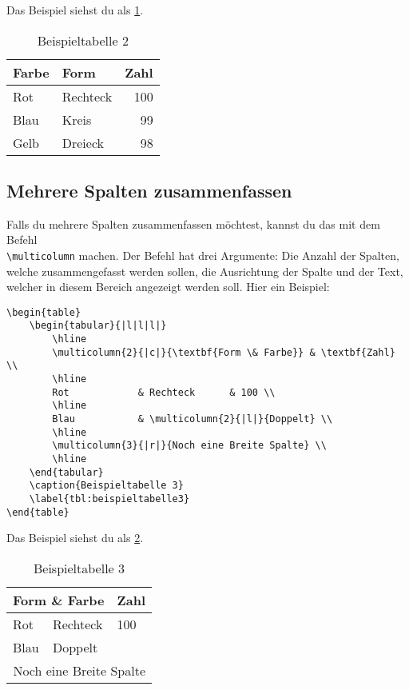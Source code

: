 Das Beispiel siehst du als \cref{tbl:beispieltabelle2}.

\begin{table}
	\centering
	\begin{tabular}{|l|l|r|}
		\textbf{Farbe} & \textbf{Form} & \textbf{Zahl} \\
		\hline
		Rot            & Rechteck      & 100 \\
		\hline
		Blau           & Kreis         & 99 \\
		\hline
		Gelb           & Dreieck       & 98 \\
		\hline
	\end{tabular}
	\caption{Beispieltabelle 2}
	\label{tbl:beispieltabelle2}
\end{table}

\subsection{Mehrere Spalten zusammenfassen}

Falls du mehrere Spalten zusammenfassen möchtest, kannst du das mit dem Befehl
\\
 \texttt{\textbackslash multicolumn} machen. Der Befehl hat drei Argumente: Die Anzahl der Spalten, welche zusammengefasst werden sollen, die Ausrichtung der Spalte und der Text, welcher in diesem Bereich angezeigt werden soll. Hier ein Beispiel:
\begin{lstlisting}
\begin{table}
	\begin{tabular}{|l|l|l|}
		\hline
		\multicolumn{2}{|c|}{\textbf{Form \& Farbe}} & \textbf{Zahl} \\
		\hline
		Rot            & Rechteck      & 100 \\
		\hline
		Blau           & \multicolumn{2}{|l|}{Doppelt} \\
		\hline
		\multicolumn{3}{|r|}{Noch eine Breite Spalte} \\
		\hline
	\end{tabular}
	\caption{Beispieltabelle 3}
	\label{tbl:beispieltabelle3}
\end{table}
\end{lstlisting}

Das Beispiel siehst du als \cref{tbl:beispieltabelle3}.

\begin{table}
	\centering
	\begin{tabular}{|l|l|l|}
		\hline
		\multicolumn{2}{|c|}{\textbf{Form \& Farbe}} & \textbf{Zahl} \\
		\hline
		Rot            & Rechteck      & 100 \\
		\hline
		Blau           & \multicolumn{2}{l|}{Doppelt} \\
		\hline
		\multicolumn{3}{|r|}{Noch eine Breite Spalte} \\
		\hline
	\end{tabular}
	\caption{Beispieltabelle 3}
	\label{tbl:beispieltabelle3}
\end{table}

